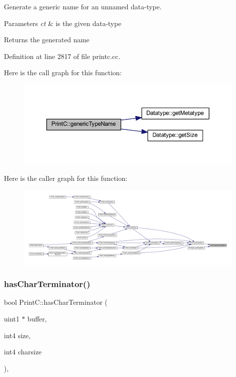 Generate a generic name for an unnamed data-\/type. 


\begin{DoxyParams}{Parameters}
{\em ct} & is the given data-\/type \\
\hline
\end{DoxyParams}
\begin{DoxyReturn}{Returns}
the generated name 
\end{DoxyReturn}


Definition at line 2817 of file printc.\+cc.

Here is the call graph for this function\+:
\nopagebreak
\begin{figure}[H]
\begin{center}
\leavevmode
\includegraphics[width=350pt]{class_print_c_a9be29ae351e163eeead58aeb5eb5720b_cgraph}
\end{center}
\end{figure}
Here is the caller graph for this function\+:
\nopagebreak
\begin{figure}[H]
\begin{center}
\leavevmode
\includegraphics[width=350pt]{class_print_c_a9be29ae351e163eeead58aeb5eb5720b_icgraph}
\end{center}
\end{figure}
\mbox{\label{class_print_c_ab6cdf16ad9ffae9a6cb0a4f875aa092d}} 
\subsubsection{\texorpdfstring{hasCharTerminator()}{hasCharTerminator()}}
{\footnotesize\ttfamily bool Print\+C\+::has\+Char\+Terminator (\begin{DoxyParamCaption}\item[{uint1 $\ast$}]{buffer,  }\item[{int4}]{size,  }\item[{int4}]{charsize }\end{DoxyParamCaption})\hspace{0.3cm}{\ttfamily [static]}, {\ttfamily [protected]}}



